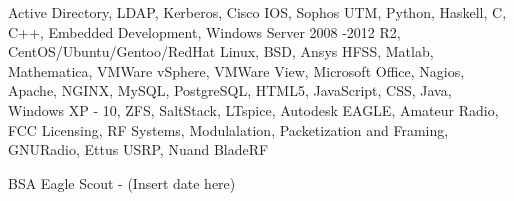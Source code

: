 
\begin{cventries}
    \begin{cvitems}
    \item {Active Directory, LDAP, Kerberos, Cisco IOS, Sophos UTM, Python, Haskell, C, C++, Embedded Development, Windows Server 2008 -2012 R2, CentOS/Ubuntu/Gentoo/RedHat Linux, BSD, Ansys HFSS, Matlab, Mathematica, VMWare vSphere, VMWare View, Microsoft Office, Nagios, Apache, NGINX, MySQL, PostgreSQL, HTML5, JavaScript, CSS, Java, Windows XP - 10, ZFS, SaltStack, LTspice, Autodesk EAGLE, Amateur Radio, FCC Licensing, RF Systems, Modulalation, Packetization and Framing, GNURadio, Ettus USRP, Nuand BladeRF}
    \item {BSA Eagle Scout - (Insert date here)}
    \end{cvitems}
\end{cventries}
